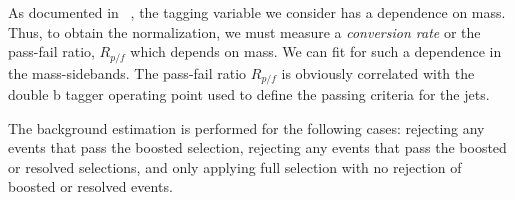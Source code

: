 As documented in ~\cite{CMS-PAS-B2G-16-026}, the tagging variable we consider has a dependence on mass.
Thus, to obtain the normalization, we must measure a \textit{conversion rate} or the pass-fail ratio, $R_{p/f}$ which depends on mass. We can fit for such a dependence in the mass-sidebands. The pass-fail ratio $R_{p/f}$ is obviously correlated with the double b tagger operating point used to define the passing criteria for the jets.

The background estimation is performed for the following cases: rejecting any events that pass the boosted selection, rejecting any events that pass the boosted or resolved selections, and only applying full selection with no rejection of boosted or resolved events. 


